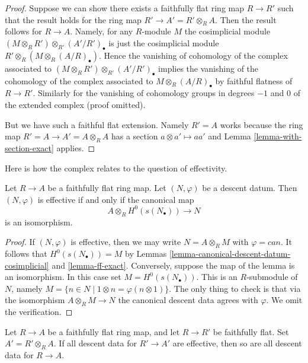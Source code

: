 \begin{proof}
Suppose we can show there exists a faithfully flat ring map
$R \to R'$ such that the result holds for the ring map
$R' \to A' = R' \otimes_R A$. Then the result follows for
$R \to A$. Namely, for any $R$-module $M$ the cosimplicial
module $(M \otimes_R R') \otimes_{R'} (A'/R')_\bullet$ is
just the cosimplicial module $R' \otimes_R (M \otimes_R (A/R)_\bullet)$.
Hence the vanishing of cohomology of the complex associated to
$(M \otimes_R R') \otimes_{R'} (A'/R')_\bullet$ implies the
vanishing of the cohomology of the complex associated to
$M \otimes_R (A/R)_\bullet$ by faithful flatness of $R \to R'$.
Similarly for the vanishing of cohomology groups in degrees
$-1$ and $0$ of the extended complex (proof omitted).

\medskip\noindent
But we have such a faithful flat extension. Namely $R' = A$ works
because the ring map $R' = A \to A' = A \otimes_R A$ has a section
$a \otimes a' \mapsto aa'$ and
Lemma \ref{lemma-with-section-exact}
applies.
\end{proof}

\noindent
Here is how the complex relates to the question of effectivity.

\begin{lemma}
\label{lemma-recognize-effective}
Let $R \to A$ be a faithfully flat ring map.
Let $(N, \varphi)$ be a descent datum.
Then $(N, \varphi)$ is effective if and only if the canonical
map
$$
A \otimes_R H^0(s(N_\bullet)) \longrightarrow N
$$
is an isomorphism.
\end{lemma}

\begin{proof}
If $(N, \varphi)$ is effective, then we may write $N = A \otimes_R M$
with $\varphi = can$. It follows that $H^0(s(N_\bullet)) = M$ by
Lemmas \ref{lemma-canonical-descent-datum-cosimplicial}
and \ref{lemma-ff-exact}. Conversely, suppose the map of the lemma
is an isomorphism. In this case set $M = H^0(s(N_\bullet))$.
This is an $R$-submodule of $N$,
namely $M = \{n \in N \mid 1 \otimes n = \varphi(n \otimes 1)\}$.
The only thing to check is that via the isomorphism
$A \otimes_R M \to N$
the canonical descent data agrees with $\varphi$.
We omit the verification.
\end{proof}

\begin{lemma}
\label{lemma-descent-descends}
Let $R \to A$ be a faithfully flat ring map, and let $R \to R'$
be faithfully flat. Set $A' = R' \otimes_R A$. If all descent data
for $R' \to A'$ are effective, then so are all descent data for $R \to A$.
\end{lemma}

